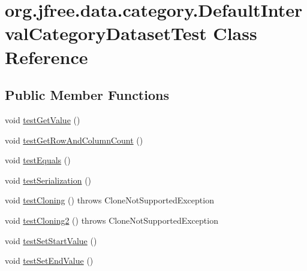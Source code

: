 \hypertarget{classorg_1_1jfree_1_1data_1_1category_1_1_default_interval_category_dataset_test}{}\section{org.\+jfree.\+data.\+category.\+Default\+Interval\+Category\+Dataset\+Test Class Reference}
\label{classorg_1_1jfree_1_1data_1_1category_1_1_default_interval_category_dataset_test}
\subsection*{Public Member Functions}
\begin{DoxyCompactItemize}
\item 
void \mbox{\hyperlink{classorg_1_1jfree_1_1data_1_1category_1_1_default_interval_category_dataset_test_aa6c6781fa0b81dddc037095ef3de825d}{test\+Get\+Value}} ()
\item 
void \mbox{\hyperlink{classorg_1_1jfree_1_1data_1_1category_1_1_default_interval_category_dataset_test_a598abd12351ba3e360d936128e3d29c5}{test\+Get\+Row\+And\+Column\+Count}} ()
\item 
void \mbox{\hyperlink{classorg_1_1jfree_1_1data_1_1category_1_1_default_interval_category_dataset_test_a11285ad36bb2982c780bb6fd7d0dc927}{test\+Equals}} ()
\item 
void \mbox{\hyperlink{classorg_1_1jfree_1_1data_1_1category_1_1_default_interval_category_dataset_test_a7c69213353d070acdadb49a6ee662682}{test\+Serialization}} ()
\item 
void \mbox{\hyperlink{classorg_1_1jfree_1_1data_1_1category_1_1_default_interval_category_dataset_test_a2c97a19f857aa9a561eee0075a19b0c7}{test\+Cloning}} ()  throws Clone\+Not\+Supported\+Exception 
\item 
void \mbox{\hyperlink{classorg_1_1jfree_1_1data_1_1category_1_1_default_interval_category_dataset_test_a659b8226113421192396a67f322d3e10}{test\+Cloning2}} ()  throws Clone\+Not\+Supported\+Exception 
\item 
void \mbox{\hyperlink{classorg_1_1jfree_1_1data_1_1category_1_1_default_interval_category_dataset_test_ab73b7e8e31928e17da05d0c903df41d5}{test\+Set\+Start\+Value}} ()
\item 
void \mbox{\hyperlink{classorg_1_1jfree_1_1data_1_1category_1_1_default_interval_category_dataset_test_adc397f48d1803750dd14a00332dea700}{test\+Set\+End\+Value}} ()

\end{DoxyCompactItemize}
